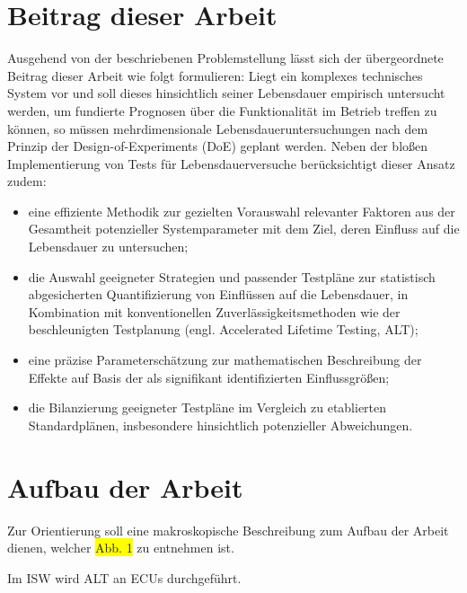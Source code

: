 \section{Beitrag dieser Arbeit}
Ausgehend von der beschriebenen Problemstellung lässt sich der übergeordnete Beitrag dieser Arbeit wie folgt formulieren: Liegt ein komplexes technisches System vor und soll dieses hinsichtlich seiner Lebensdauer empirisch untersucht werden, um fundierte Prognosen über die Funktionalität im Betrieb treffen zu können, so müssen mehrdimensionale Lebensdaueruntersuchungen nach dem Prinzip der Design-of-Experiments (\ac{DoE}) geplant werden.
Neben der bloßen Implementierung von Tests für Lebensdauerversuche berücksichtigt dieser Ansatz zudem:
\begin{itemize}
    \item eine effiziente Methodik zur gezielten Vorauswahl relevanter Faktoren aus der Gesamtheit potenzieller Systemparameter mit dem Ziel, deren Einfluss auf die Lebensdauer zu untersuchen;
    \item die Auswahl geeigneter Strategien und passender Testpläne zur statistisch abgesicherten Quantifizierung von Einflüssen auf die Lebensdauer, in Kombination mit konventionellen Zuverlässigkeitsmethoden wie der beschleunigten Testplanung (engl. Accelerated Lifetime Testing, ALT);
    \item eine präzise Parameterschätzung zur mathematischen Beschreibung der Effekte auf Basis der als signifikant identifizierten Einflussgrößen;
    \item die Bilanzierung geeigneter Testpläne im Vergleich zu etablierten Standardplänen, insbesondere hinsichtlich potenzieller Abweichungen.
\end{itemize}

\section{Aufbau der Arbeit}
Zur Orientierung soll eine makroskopische Beschreibung zum Aufbau der Arbeit dienen, welcher \colorbox{yellow}{Abb. 1} zu entnehmen ist.

Im \ac{ISW} wird \ac{ALT} an \ac{ECU}s durchgeführt.